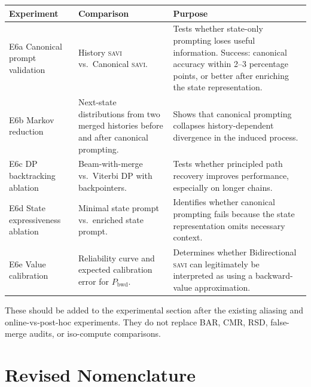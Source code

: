 \documentclass[11pt,letterpaper]{article}
\newcommand{\Pbwd}{P_{\mathrm{bwd}}}
\newcommand{\SAVI}{\textsc{savi}\xspace}
\begin{document}
\vspace{4pt}
\begin{center}
\small
\begin{tabularx}{\linewidth}{lXX}
\toprule
\textbf{Experiment} & \textbf{Comparison} & \textbf{Purpose} \\
\midrule
E6a Canonical prompt validation
  & History \SAVI vs.\ Canonical \SAVI.
  & Tests whether state-only prompting loses useful information.
    Success: canonical accuracy within 2--3 percentage points, or better after
    enriching the state representation. \\
\addlinespace
E6b Markov reduction
  & Next-state distributions from two merged histories before and after canonical prompting.
  & Shows that canonical prompting collapses history-dependent divergence in the induced process. \\
\addlinespace
E6c DP backtracking ablation
  & Beam-with-merge vs.\ Viterbi DP with backpointers.
  & Tests whether principled path recovery improves performance, especially on longer chains. \\
\addlinespace
E6d State expressiveness ablation
  & Minimal state prompt vs.\ enriched state prompt.
  & Identifies whether canonical prompting fails because the state representation omits
    necessary context. \\
\addlinespace
E6e Value calibration
  & Reliability curve and expected calibration error for $\Pbwd$.
  & Determines whether Bidirectional \SAVI can legitimately be interpreted as using a
    backward-value approximation. \\
\bottomrule
\end{tabularx}
\end{center}
\vspace{4pt}

These should be added to the experimental section after the existing aliasing and
online-vs-post-hoc experiments.
They do not replace BAR, CMR, RSD, false-merge audits, or iso-compute comparisons.

\section{Revised Nomenclature}
\end{document}
